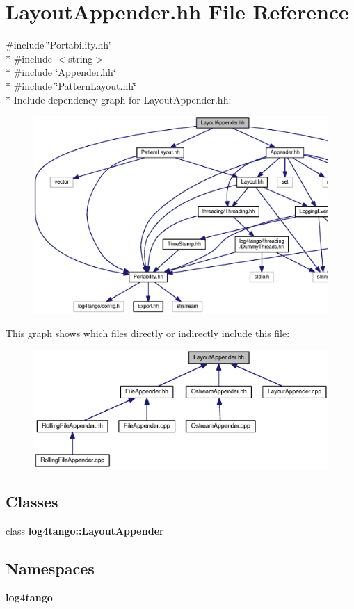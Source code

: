 \section{Layout\-Appender.\-hh File Reference}
\label{LayoutAppender_8hh}
{\ttfamily \#include \char`\"{}Portability.\-hh\char`\"{}}\\*
{\ttfamily \#include $<$string$>$}\\*
{\ttfamily \#include \char`\"{}Appender.\-hh\char`\"{}}\\*
{\ttfamily \#include \char`\"{}Pattern\-Layout.\-hh\char`\"{}}\\*
Include dependency graph for Layout\-Appender.\-hh\-:
\nopagebreak
\begin{figure}[H]
\begin{center}
\leavevmode
\includegraphics[width=350pt]{d0/dfa/LayoutAppender_8hh__incl}
\end{center}
\end{figure}
This graph shows which files directly or indirectly include this file\-:
\nopagebreak
\begin{figure}[H]
\begin{center}
\leavevmode
\includegraphics[width=350pt]{d6/df5/LayoutAppender_8hh__dep__incl}
\end{center}
\end{figure}
\subsection*{Classes}
\begin{DoxyCompactItemize}
\item 
class {\bf log4tango\-::\-Layout\-Appender}
\end{DoxyCompactItemize}
\subsection*{Namespaces}
\begin{DoxyCompactItemize}
\item 
{\bf log4tango}
\end{DoxyCompactItemize}
